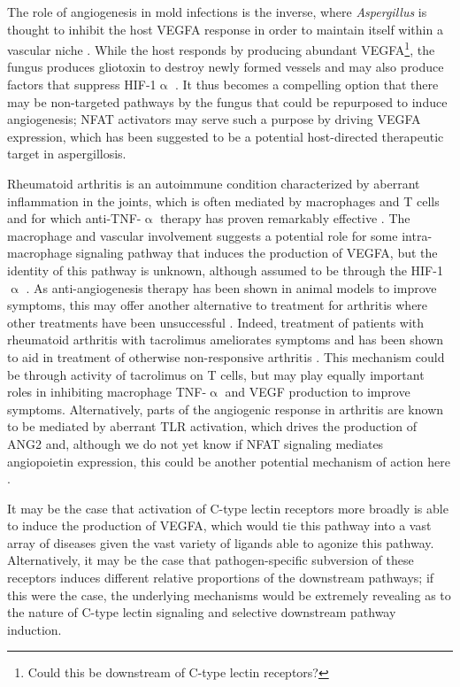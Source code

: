 The role of angiogenesis in mold infections is the inverse, where \textit{Aspergillus} is thought to inhibit the host VEGFA response in order to maintain itself within a vascular niche \citep{Kontoyiannis2010}. While the host responds by producing abundant VEGFA\footnote{Could this be downstream of C\hyp{}type lectin receptors?}, the fungus produces gliotoxin to destroy newly formed vessels and may also produce factors that suppress HIF\hyp{}1$\upalpha$ \citep{BenAmi2013}. It thus becomes a compelling option that there may be non\hyp{}targeted pathways by the fungus that could be repurposed to induce angiogenesis; NFAT activators may serve such a purpose by driving VEGFA expression, which has been suggested to be a potential host\hyp{}directed therapeutic target in aspergillosis.

Rheumatoid arthritis is an autoimmune condition characterized by aberrant inflammation in the joints, which is often mediated by macrophages and T cells and for which anti\hyp{}TNF\hyp{}$\upalpha$ therapy has proven remarkably effective \citep{Feldmann2002}. The macrophage and vascular involvement suggests a potential role for some intra\hyp{}macrophage signaling pathway that induces the production of VEGFA, but the identity of this pathway is unknown, although assumed to be through the HIF\hyp{}1$\upalpha$ \citep{MacDonald2018}. As anti\hyp{}angiogenesis therapy has been shown in animal models to improve symptoms, this may offer another alternative to treatment for arthritis where other treatments have been unsuccessful \citep{Paleolog2002, Elshabrawy2015}. Indeed, treatment of patients with rheumatoid arthritis with tacrolimus ameliorates symptoms and has been shown to aid in treatment of otherwise non\hyp{}responsive arthritis \citep{Dutta2011}. This mechanism could be through activity of tacrolimus on T cells, but may play equally important roles in inhibiting macrophage TNF\hyp{}$\upalpha$ and VEGF production to improve symptoms. Alternatively, parts of the angiogenic response in arthritis are known to be mediated by aberrant TLR activation, which drives the production of ANG2 and, although we do not yet know if NFAT signaling mediates angiopoietin expression, this could be another potential mechanism of action here \citep{Saber2011}.

It may be the case that activation of C\hyp{}type lectin receptors more broadly is able to induce the production of VEGFA, which would tie this pathway into a vast array of diseases given the vast variety of ligands able to agonize this pathway. Alternatively, it may be the case that pathogen\hyp{}specific subversion of these receptors induces different relative proportions of the downstream pathways; if this were the case, the underlying mechanisms would be extremely revealing as to the nature of C\hyp{}type lectin signaling and selective downstream pathway induction. 


